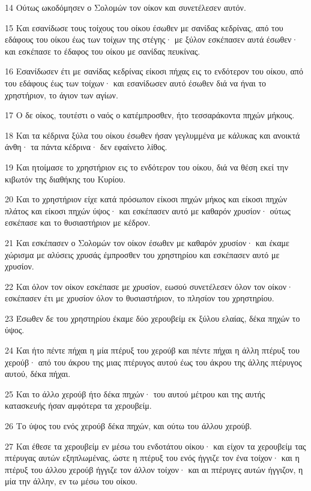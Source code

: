 \par 14 Ούτως ωκοδόμησεν ο Σολομών τον οίκον και συνετέλεσεν αυτόν.
\par 15 Και εσανίδωσε τους τοίχους του οίκου έσωθεν με σανίδας κεδρίνας, από του εδάφους του οίκου έως των τοίχων της στέγης· με ξύλον εσκέπασεν αυτά έσωθεν· και εσκέπασε το έδαφος του οίκου με σανίδας πευκίνας.
\par 16 Εσανίδωσεν έτι με σανίδας κεδρίνας είκοσι πήχας εις το ενδότερον του οίκου, από του εδάφους έως των τοίχων· και εσανίδωσεν αυτό έσωθεν διά να ήναι το χρηστήριον, το άγιον των αγίων.
\par 17 Ο δε οίκος, τουτέστι ο ναός ο κατέμπροσθεν, ήτο τεσσαράκοντα πηχών μήκους.
\par 18 Και τα κέδρινα ξύλα του οίκου έσωθεν ήσαν γεγλυμμένα με κάλυκας και ανοικτά άνθη· τα πάντα κέδρινα· δεν εφαίνετο λίθος.
\par 19 Και ητοίμασε το χρηστήριον εις το ενδότερον του οίκου, διά να θέση εκεί την κιβωτόν της διαθήκης του Κυρίου.
\par 20 Και το χρηστήριον είχε κατά πρόσωπον είκοσι πηχών μήκος και είκοσι πηχών πλάτος και είκοσι πηχών ύψος· και εσκέπασεν αυτό με καθαρόν χρυσίον· ούτως εσκέπασε και το θυσιαστήριον με κέδρον.
\par 21 Και εσκέπασεν ο Σολομών τον οίκον έσωθεν με καθαρόν χρυσίον· και έκαμε χώρισμα με αλύσεις χρυσάς έμπροσθεν του χρηστηρίου και εσκέπασεν αυτό με χρυσίον.
\par 22 Και όλον τον οίκον εσκέπασε με χρυσίον, εωσού συνετέλεσεν όλον τον οίκον· εσκέπασεν έτι με χρυσίον όλον το θυσιαστήριον, το πλησίον του χρηστηρίου.
\par 23 Έσωθεν δε του χρηστηρίου έκαμε δύο χερουβείμ εκ ξύλου ελαίας, δέκα πηχών το ύψος.
\par 24 Και ήτο πέντε πήχαι η μία πτέρυξ του χερούβ και πέντε πήχαι η άλλη πτέρυξ του χερούβ· από του άκρου της μιας πτέρυγος αυτού έως του άκρου της άλλης πτέρυγος αυτού, δέκα πήχαι.
\par 25 Και το άλλο χερούβ ήτο δέκα πηχών· του αυτού μέτρου και της αυτής κατασκευής ήσαν αμφότερα τα χερουβείμ.
\par 26 Το ύψος του ενός χερούβ δέκα πηχών, και ούτω του άλλου χερούβ.
\par 27 Και έθεσε τα χερουβείμ εν μέσω του ενδοτάτου οίκου· και είχον τα χερουβείμ τας πτέρυγας αυτών εξηπλωμένας, ώστε η πτέρυξ του ενός ήγγιζε τον ένα τοίχον· και η πτέρυξ του άλλου χερούβ ήγγιζε τον άλλον τοίχον· και αι πτέρυγες αυτών ήγγιζον, η μία την άλλην, εν τω μέσω του οίκου.
